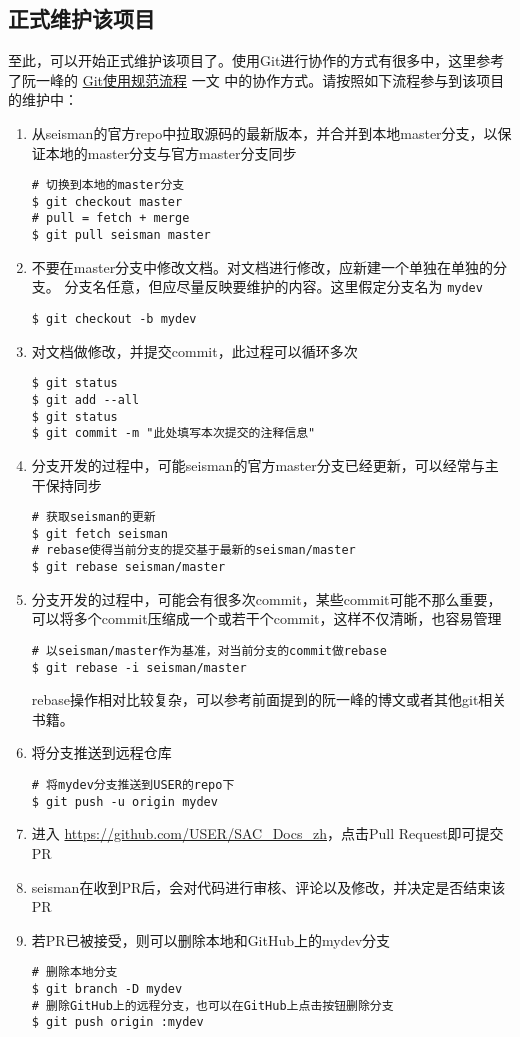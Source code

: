 \subsection{正式维护该项目}
至此，可以开始正式维护该项目了。使用Git进行协作的方式有很多中，这里参考了阮一峰的
\href{http://www.ruanyifeng.com/blog/2015/08/git-use-process.html}{Git使用规范流程} 一文
中的协作方式。请按照如下流程参与到该项目的维护中：
\begin{enumerate}
\item 从seisman的官方repo中拉取源码的最新版本，并合并到本地master分支，以保证本地的master分支与官方master分支同步
\begin{verbatim}
# 切换到本地的master分支
$ git checkout master
# pull = fetch + merge
$ git pull seisman master
\end{verbatim}
\item 不要在master分支中修改文档。对文档进行修改，应新建一个单独在单独的分支。
    分支名任意，但应尽量反映要维护的内容。这里假定分支名为 \texttt{mydev}
\begin{verbatim}
$ git checkout -b mydev
\end{verbatim}
\item 对文档做修改，并提交commit，此过程可以循环多次
\begin{verbatim}
$ git status
$ git add --all
$ git status
$ git commit -m "此处填写本次提交的注释信息"
\end{verbatim}
\item 分支开发的过程中，可能seisman的官方master分支已经更新，可以经常与主干保持同步
\begin{verbatim}
# 获取seisman的更新
$ git fetch seisman
# rebase使得当前分支的提交基于最新的seisman/master
$ git rebase seisman/master
\end{verbatim}
\item 分支开发的过程中，可能会有很多次commit，某些commit可能不那么重要，可以将多个commit压缩成一个或若干个commit，这样不仅清晰，也容易管理
\begin{verbatim}
# 以seisman/master作为基准，对当前分支的commit做rebase
$ git rebase -i seisman/master
\end{verbatim}
rebase操作相对比较复杂，可以参考前面提到的阮一峰的博文或者其他git相关书籍。
\item 将分支推送到远程仓库
\begin{verbatim}
# 将mydev分支推送到USER的repo下
$ git push -u origin mydev
\end{verbatim}
\item 进入 \url{https://github.com/USER/SAC_Docs_zh}，点击Pull Request即可提交PR
\item seisman在收到PR后，会对代码进行审核、评论以及修改，并决定是否结束该PR
\item 若PR已被接受，则可以删除本地和GitHub上的mydev分支
\begin{verbatim}
# 删除本地分支
$ git branch -D mydev
# 删除GitHub上的远程分支，也可以在GitHub上点击按钮删除分支
$ git push origin :mydev
\end{verbatim}
\end{enumerate}

